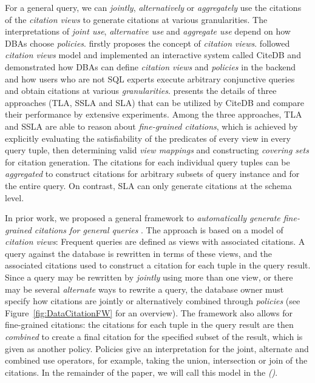 {For a general query, we can {\em jointly}, {\em alternatively} or {\em aggregately} use the citations of the {\em citation views} to generate citations at various granularities. The interpretations of {\em joint use}, {\em alternative use} and {\em aggregate use} depend on how DBAs choose {\em policies}. \cite{davidson2017model} firstly proposes the concept of {\em citation views}. \cite{alawini2017automating} followed {\em citation views} model and implemented an interactive system called CiteDB and demonstrated how DBAs can define {\em citation views} and {\em policies} in the backend and how users who are not SQL experts execute arbitrary conjunctive queries and obtain citations at various {\em granularities}. \cite{wu2018data} presents the details of three approaches (TLA, SSLA and SLA) that can be utilized by CiteDB and compare their performance by extensive experiments. Among the three approaches, TLA and SSLA are able to reason about {\em fine-grained citations}, which is achieved by explicitly evaluating the satisfiability of the predicates of every view in every query tuple, then determining valid {\em view mappings} and constructing {\em covering sets} for citation generation. The citations for each individual query tuples can be {\em aggregated} to construct citations for arbitrary subsets of query instance and for the entire query. On contrast, SLA can only generate citations at the schema level.  
}

In prior work, we proposed a general framework to {\em automatically generate fine-grained citations for general queries} \cite{wu2018data}\cite{alawini2017automating}\cite{davidson2017model}.
  The approach is based on a model of {\em citation views}: Frequent queries  are defined as views with associated citations. A query against the database is rewritten in terms of these views, and the associated citations used to construct a citation for each tuple in the query result. Since a query may be rewritten by \textit{jointly} using more than one view, or there may be several \textit{alternate} ways to rewrite a query, the database owner must specify how citations are jointly or alternatively combined through \textit{policies} (see Figure~\ref{fig:DataCitationFW} for an overview).  The framework also allows for fine-grained citations: the citations for each tuple in the query result are then \textit{combined} to create a final citation for the specified subset of the result, which is given as another policy.  Policies give an interpretation for the joint, alternate and combined use operators, for example, taking the union, intersection or join of the citations.  In the remainder of the paper, we will call this model in \cite{wu2018data} the {\em {\rbafull} (\rba)}.

